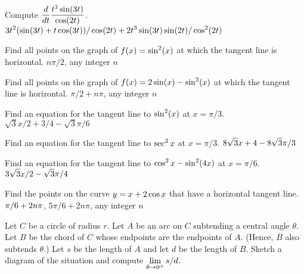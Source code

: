 \exercise Compute $\displaystyle{d\over dt}{t^3 \sin (3t)\over\cos (2t)}$.
\answer $\displaystyle 3t^2(\sin(3t)+t\cos(3t))/\cos(2t)+2t^3\sin(3t)\sin(2t)/\cos^2(2t)$
\endanswer
\endexercise

\exercise Find all points on the graph of
$\displaystyle f(x)=\sin^2(x)$ at which the tangent line is horizontal.
\answer $n\pi/2$, any integer $n$
\endanswer
\endexercise

\exercise Find all points on the graph of $\displaystyle f(x) = 2\sin(x) -
\sin^2(x)$ at which the tangent line is horizontal.
\answer $\pi/2+n\pi$, any integer $n$
\endanswer
\endexercise

\exercise Find an
 equation for the tangent line to $\displaystyle \sin^2(x)$ at 
$x=\pi/3$.
\answer $\sqrt3x/2+3/4-\sqrt3\pi/6$
\endanswer
\endexercise

\exercise Find an equation for the tangent line to $\displaystyle \sec ^2 x$
at $x=\pi/3$.
\answer $\displaystyle 8\sqrt3x+4-8\sqrt3\pi/3$
\endanswer
\endexercise

\exercise Find an equation for the tangent line to $\displaystyle \cos ^2 x -
\sin ^2 (4x)$ at $x=\pi/6$.
\answer $\displaystyle 3\sqrt3x/2-\sqrt3\pi/4$
\endanswer
\endexercise

\exercise Find the points on the curve $\displaystyle y= x+ 2\cos x$ that have a
horizontal tangent line.
\answer $\displaystyle \pi/6+2n\pi$, $5\pi/6+2n\pi$, any integer $n$
\endanswer
\endexercise

\exercise Let $C$ be a circle of radius $r$. Let $A$ be an arc on $C$
subtending a central angle $\theta$. Let $B$ be the chord of
$C$ whose endpoints are the endpoints of $A$. (Hence, $B$ also
subtends $\theta$.) Let $s$ be the length of $A$
and let $d$ be the length of $B$. Sketch a diagram of the situation
and compute $\displaystyle \lim_{\theta \to 0^+ } s/d$.
\endexercise

\endexercises


